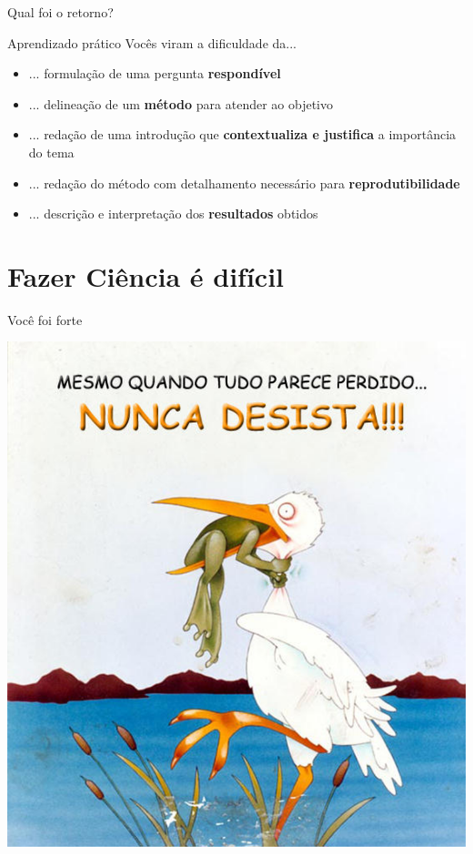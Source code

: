 \documentclass{beamer}
\begin{document}
\begin{frame}{\scriptsize Qual foi o retorno?}
  \begin{block}{Aprendizado prático}
    {\tiny \centering Vocês viram a dificuldade da...}
    \bigskip
    \begin{itemize}
      \scriptsize
    \item<1,6> ... formulação de uma pergunta {\bf respondível}
      \bigskip
    \item<2,6> ... delineação de um {\bf método} para atender ao objetivo
      \bigskip
    \item<3,6> {... redação de uma introdução que {\bf contextualiza e justifica} a importância do tema}
      \bigskip
    \item<4,6> ... redação do método com detalhamento necessário para {\bf reprodutibilidade} 
      \bigskip
    \item<5,6> ... descrição e interpretação dos {\bf resultados} obtidos
    \end{itemize}
  \end{block}
    \vfill
\end{frame}

\section{Fazer Ciência é difícil}

\begin{frame}{Você foi forte}
  \begin{center}
    \includegraphics[height=.75\textheight]{Encerramento/naodesista3}

    \vfill
  \end{center}
\end{frame}
\end{document}
